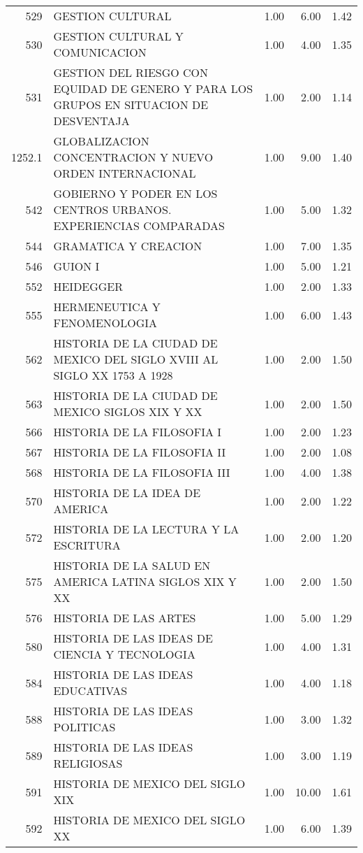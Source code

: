 \begin{table}[ht]
\begin{tabular}{rlrrr}
  529 & GESTION CULTURAL & 1.00 & 6.00 & 1.42 \\ 
  530 & GESTION CULTURAL Y COMUNICACION & 1.00 & 4.00 & 1.35 \\ 
  531 & GESTION DEL RIESGO CON EQUIDAD DE GENERO Y PARA LOS GRUPOS EN SITUACION DE DESVENTAJA & 1.00 & 2.00 & 1.14 \\ 
  1252.1 & GLOBALIZACION CONCENTRACION Y NUEVO ORDEN INTERNACIONAL & 1.00 & 9.00 & 1.40 \\ 
  542 & GOBIERNO Y PODER EN LOS CENTROS URBANOS. EXPERIENCIAS COMPARADAS & 1.00 & 5.00 & 1.32 \\ 
  544 & GRAMATICA Y CREACION & 1.00 & 7.00 & 1.35 \\ 
  546 & GUION I & 1.00 & 5.00 & 1.21 \\ 
  552 & HEIDEGGER & 1.00 & 2.00 & 1.33 \\ 
  555 & HERMENEUTICA Y FENOMENOLOGIA & 1.00 & 6.00 & 1.43 \\ 
  562 & HISTORIA DE LA CIUDAD DE MEXICO DEL SIGLO XVIII AL SIGLO XX 1753 A 1928 & 1.00 & 2.00 & 1.50 \\ 
  563 & HISTORIA DE LA CIUDAD DE MEXICO SIGLOS XIX Y XX & 1.00 & 2.00 & 1.50 \\ 
  566 & HISTORIA DE LA FILOSOFIA I & 1.00 & 2.00 & 1.23 \\ 
  567 & HISTORIA DE LA FILOSOFIA II & 1.00 & 2.00 & 1.08 \\ 
  568 & HISTORIA DE LA FILOSOFIA III & 1.00 & 4.00 & 1.38 \\ 
  570 & HISTORIA DE LA IDEA DE AMERICA & 1.00 & 2.00 & 1.22 \\ 
  572 & HISTORIA DE LA LECTURA Y LA ESCRITURA & 1.00 & 2.00 & 1.20 \\ 
  575 & HISTORIA DE LA SALUD EN AMERICA LATINA SIGLOS XIX Y XX & 1.00 & 2.00 & 1.50 \\ 
  576 & HISTORIA DE LAS ARTES & 1.00 & 5.00 & 1.29 \\ 
  580 & HISTORIA DE LAS IDEAS DE CIENCIA Y TECNOLOGIA & 1.00 & 4.00 & 1.31 \\ 
  584 & HISTORIA DE LAS IDEAS EDUCATIVAS & 1.00 & 4.00 & 1.18 \\ 
  588 & HISTORIA DE LAS IDEAS POLITICAS & 1.00 & 3.00 & 1.32 \\ 
  589 & HISTORIA DE LAS IDEAS RELIGIOSAS & 1.00 & 3.00 & 1.19 \\ 
  591 & HISTORIA DE MEXICO DEL SIGLO XIX & 1.00 & 10.00 & 1.61 \\ 
  592 & HISTORIA DE MEXICO DEL SIGLO XX & 1.00 & 6.00 & 1.39 \\ 

\end{tabular}
\end{table}
